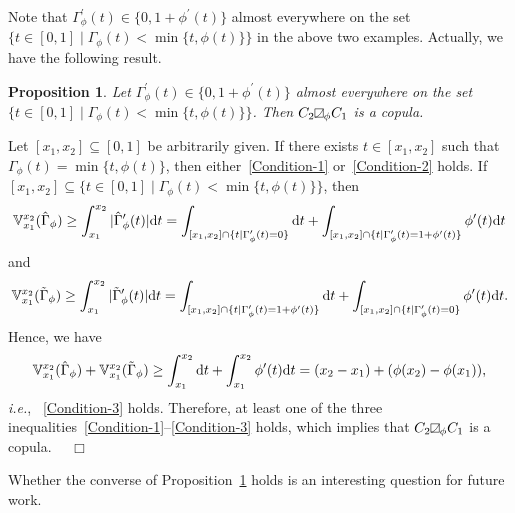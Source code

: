 \documentclass[12pt]{article}
\renewenvironment{proof}{\noindent{\bf Proof.}}{~~$\Box$}
\theoremstyle{plain}
\newtheorem{prot}[thrm]{Proposition}
\theoremstyle{definition}
\newcommand{\MySs}{
\begin{tikzpicture}[baseline]
\draw (0,0em) -- (0em,0.6em) -- (0.6em,0.6em) -- (0.6em,0em) -- (0,0em);
\draw (0,0em) parabola (0.6em, 0.6em);
\end{tikzpicture}}
\begin{document}
Note that $\Gamma^\prime_\phi(t)\in\{0, 1+\phi^\prime(t)\}$ almost everywhere on the set $\{t\in[0, 1]\mid \Gamma_\phi(t)<\min\{t, \phi(t)\}\}$ in the above two examples. Actually, we have the following result.
\begin{prot}\label{prot-simcri}
Let $\Gamma^\prime_\phi(t)\in\{0, 1+\phi^\prime(t)\}$ almost everywhere on the set $\{t\in[0, 1]\mid \Gamma_\phi(t)<\min\{t, \phi(t)\}\}$. Then $C_2\MySs_\phi C_1$ is a copula.
\end{prot}
\begin{proof}
Let $[x_1, x_2]\subseteq[0, 1]$ be arbitrarily given. If there exists $t\in [x_1, x_2]$ such that $\Gamma_\phi(t)=\min\{t, \phi(t)\}$, then either~\eqref{Condition-1} or~\eqref{Condition-2} holds. If $[x_1, x_2]\subseteq\{t\in[0, 1]\mid \Gamma_\phi(t)<\min\{t, \phi(t)\}\}$, then
\[
\mathbb{V}_{x_1}^{x_2}(\hat{\Gamma}_\phi)\geq\int_{x_1}^{x_2}|\hat{\Gamma}_\phi^\prime(t)|{\rm d}t=\int_{[x_1, x_2]\cap\{t\mid \Gamma^\prime_\phi(t)=0\}}{\rm d}t+ \int_{[x_1, x_2]\cap\{t\mid \Gamma^\prime_\phi(t)= 1+\phi^\prime(t)\}} \phi^\prime(t){\rm d}t
\]
and
\[
\mathbb{V}_{x_1}^{x_2}(\tilde{\Gamma}_\phi)\geq\int_{x_1}^{x_2}|\tilde{\Gamma}_\phi^\prime(t)|{\rm d}t=\int_{[x_1, x_2]\cap\{t\mid \Gamma^\prime_\phi(t)=1+\phi^\prime(t)\}}{\rm d}t+ \int_{[x_1, x_2]\cap\{t\mid \Gamma^\prime_\phi(t)=0\}} \phi^\prime(t){\rm d}t.
\]
Hence, we have
\[
\mathbb{V}_{x_1}^{x_2}(\hat{\Gamma}_\phi)+\mathbb{V}_{x_1}^{x_2}(\tilde{\Gamma}_\phi)\geq\int_{x_1}^{x_2}{\rm d}t+\int_{x_1}^{x_2}\phi^\prime(t){\rm d}t=(x_2-x_1)+(\phi(x_2)-\phi(x_1)),
\]
\emph{i.e.}, ~\eqref{Condition-3} holds. Therefore, at least one of the three inequalities~\eqref{Condition-1}--\eqref{Condition-3} holds, which implies that $C_2\MySs_\phi C_1$ is a copula.
\end{proof}

Whether the converse of Proposition~\ref{prot-simcri} holds is an interesting question for future work.
\end{document}
